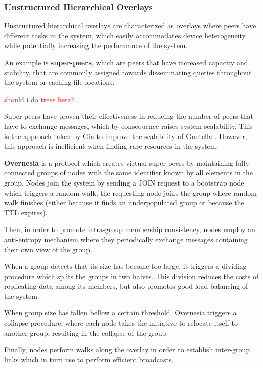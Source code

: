 \subsubsection{Unstructured Hierarchical Overlays}

Unstructured hierarchical overlays are characterized as overlays where peers have different tasks in the system, which easily accommodates device heterogeneity while potentially increasing the performance of the system. 

An example is \textbf{super-peers}, which are peers that have increased capacity and stability, that are commonly assigned towards disseminating queries throughout the system or caching file locations.

\textcolor{red}{ should i do trees here?}

Super-peers have proven their effectiveness in reducing the number of peers that have to exchange messages, which by consequence raises system scalability. This is the approach taken by Gia \cite{Chawathe2003} to improve the scalability of Gnutella \cite{gnutella_gtk}. However, this approach is inefficient when finding rare resources in the system.

\textbf{Overnesia} \cite{leitao2014overnesia} is a protocol which creates virtual super-peers by maintaining fully connected groups of nodes with the same identifier known by all elements in the group. Nodes join the system by sending a JOIN request to a bootstrap node which triggers a random walk, the requesting node joins the group where random walk finishes (either because it finds an underpopulated group or because the TTL expires). 

Then, in order to promote intra-group membership consistency, nodes employ an anti-entropy mechanism where they periodically exchange messages containing their own view of the group. 

When a group detects that its size has become too large, it triggers a dividing procedure which splits the groups in two halves. This division reduces the costs of replicating data among its members, but also promotes good load-balancing of the system. 

When group size has fallen bellow a certain threshold, Overnesia triggers a collapse procedure, where each node takes the initiative to relocate itself to another group, resulting in the collapse of the group. 

Finally, nodes perform walks along the overlay in order to establish inter-group links which in turn use to perform efficient broadcasts.

